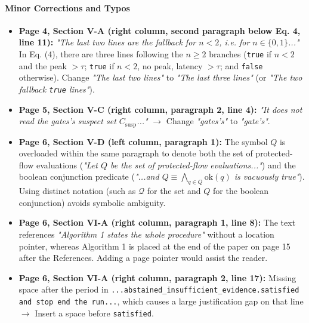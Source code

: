 \documentclass[11pt,a4paper]{article}
\begin{document}
\paragraph{Minor Corrections and Typos}
\begin{itemize}[leftmargin=1.8em,itemsep=2pt]
\item \textbf{Page 4, Section V-A (right column, second paragraph below Eq. 4, line 11):} \emph{"The last two lines are the fallback for $n < 2$, i.e. for $n \in \{0, 1\}$..."} In Eq. (4), there are three lines following the $n \ge 2$ branches (\texttt{true} if $n < 2$ and the peak $> \tau$; \texttt{true} if $n < 2$, no peak, latency $> \tau$; and \texttt{false} otherwise). Change \emph{"The last two lines"} to \emph{"The last three lines"} (or \emph{"The two fallback \texttt{true} lines"}).
\end{itemize}
\begin{itemize}[leftmargin=1.8em,itemsep=2pt]
\item \textbf{Page 5, Section V-C (right column, paragraph 2, line 4):} \emph{"It does not read the gates's suspect set $C_{\text{susp}}$..."} $\rightarrow$ Change \emph{"gates's"} to \emph{"gate's"}.
\end{itemize}
\begin{itemize}[leftmargin=1.8em,itemsep=2pt]
\item \textbf{Page 6, Section V-D (left column, paragraph 1):} The symbol $Q$ is overloaded within the same paragraph to denote both the set of protected-flow evaluations (\emph{"Let $Q$ be the set of protected-flow evaluations..."}) and the boolean conjunction predicate (\emph{"...and $Q \equiv \bigwedge_{q \in Q} \text{ok}(q)$ is vacuously true"}). Using distinct notation (such as $\mathcal{Q}$ for the set and $Q$ for the boolean conjunction) avoids symbolic ambiguity.
\end{itemize}
\begin{itemize}[leftmargin=1.8em,itemsep=2pt]
\item \textbf{Page 6, Section VI-A (right column, paragraph 1, line 8):} The text references \emph{"Algorithm 1 states the whole procedure"} without a location pointer, whereas Algorithm 1 is placed at the end of the paper on page 15 after the References. Adding a page pointer would assist the reader.
\end{itemize}
\begin{itemize}[leftmargin=1.8em,itemsep=2pt]
\item \textbf{Page 6, Section VI-A (right column, paragraph 2, line 17):} Missing space after the period in \texttt{...abstained\_insufficient\_evidence.satisfied and stop end the run...}, which causes a large justification gap on that line $\rightarrow$ Insert a space before \texttt{satisfied}.
\end{itemize}
\end{document}
